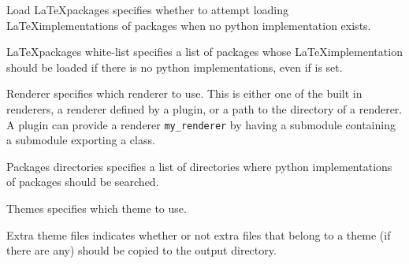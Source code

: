 \begin{configuration}{Load \LaTeX packages}
specifies whether to attempt loading \LaTeX implementations of packages
when no python implementation exists.
\end{configuration}

\begin{configuration}{\LaTeX packages white-list}
specifies a list of packages whose \LaTeX implementation should be loaded
if there is no python implementations, even if 
is set.
\end{configuration}

\begin{configuration}{Renderer}
specifies which renderer to use. This is either one of the built in renderers,
a renderer defined by a plugin, or a path to the directory of a renderer.
A plugin can provide a renderer \verb+my_renderer+ by having a
 submodule containing a  submodule exporting
a  class.
\end{configuration}

\begin{configuration}{Packages directories}
specifies a list of directories where python implementations
of packages should be searched.
\end{configuration}

\begin{configuration}{Themes}
specifies which theme to use.
\end{configuration}

\begin{configuration}{Extra theme files}
indicates whether or not extra files that belong to a theme (if there are
any) should be copied to the output directory.
\end{configuration}


